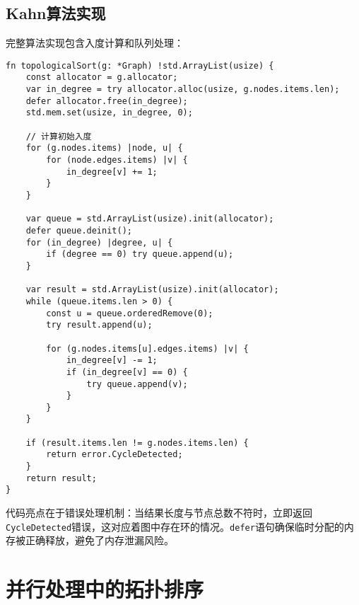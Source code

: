 \section{Kahn算法实现}
完整算法实现包含入度计算和队列处理：\par
\begin{lstlisting}[language=zig]
fn topologicalSort(g: *Graph) !std.ArrayList(usize) {
    const allocator = g.allocator;
    var in_degree = try allocator.alloc(usize, g.nodes.items.len);
    defer allocator.free(in_degree);
    std.mem.set(usize, in_degree, 0);

    // 计算初始入度
    for (g.nodes.items) |node, u| {
        for (node.edges.items) |v| {
            in_degree[v] += 1;
        }
    }

    var queue = std.ArrayList(usize).init(allocator);
    defer queue.deinit();
    for (in_degree) |degree, u| {
        if (degree == 0) try queue.append(u);
    }

    var result = std.ArrayList(usize).init(allocator);
    while (queue.items.len > 0) {
        const u = queue.orderedRemove(0);
        try result.append(u);
        
        for (g.nodes.items[u].edges.items) |v| {
            in_degree[v] -= 1;
            if (in_degree[v] == 0) {
                try queue.append(v);
            }
        }
    }

    if (result.items.len != g.nodes.items.len) {
        return error.CycleDetected;
    }
    return result;
}
\end{lstlisting}
代码亮点在于错误处理机制：当结果长度与节点总数不符时，立即返回\verb!CycleDetected!错误，这对应着图中存在环的情况。\verb!defer!语句确保临时分配的内存被正确释放，避免了内存泄漏风险。\par
\chapter{并行处理中的拓扑排序}
